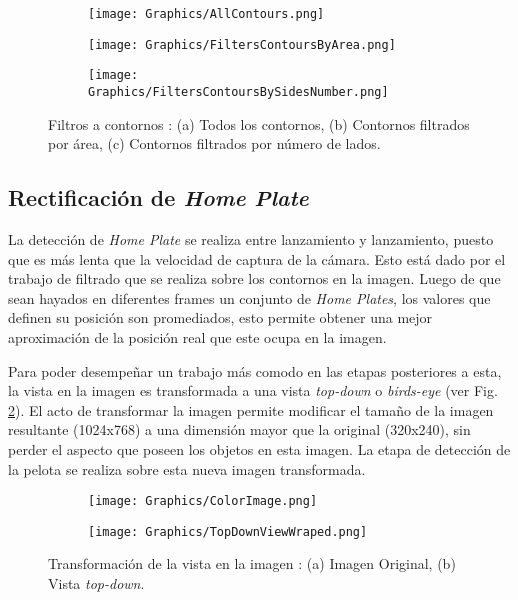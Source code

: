 \begin{figure}[h!]
	\centering
	\begin{subfigure}[b]{0.32\linewidth}
		\centering
		\texttt{[image: Graphics/AllContours.png]}
		\caption{}
	\end{subfigure}
	\begin{subfigure}[b]{0.32\linewidth}
		\centering
		\texttt{[image: Graphics/FiltersContoursByArea.png]}
		\caption{}
	\end{subfigure}
	\begin{subfigure}[b]{0.32\linewidth}
		\centering
		\texttt{[image: Graphics/FiltersContoursBySidesNumber.png]}
		\caption{}
	\end{subfigure}
	\caption{Filtros a contornos : (a) Todos los contornos, (b) Contornos filtrados por área, (c) Contornos filtrados por número de lados.}
	\label{fig:FilteredContours}
\end{figure}

\subsection{Rectificación de \textit{Home Plate}}

La detección de \textit{Home Plate} se realiza entre lanzamiento y lanzamiento, puesto que es más lenta que la velocidad de captura de la cámara. Esto está dado por el trabajo de filtrado que se realiza sobre los contornos en la imagen. Luego de que sean hayados en diferentes frames un conjunto de \textit{Home Plates}, los valores que definen su posición son promediados, esto permite obtener una mejor aproximación de la posición real que este ocupa en la imagen.

Para poder desempeñar un trabajo más comodo en las etapas posteriores a esta, la vista en la imagen es transformada a una vista \textit{top-down} o \textit{birds-eye} (ver Fig. \ref{fig:TopDownView}). El acto de transformar la imagen permite modificar el tamaño de la imagen resultante (1024x768) a una dimensión mayor que la original (320x240), sin perder el aspecto que poseen los objetos en esta imagen. La etapa de detección de la pelota se realiza sobre esta nueva imagen transformada.

\begin{figure}[!h]
	\centering
	\begin{subfigure}[b]{0.35\linewidth}
		\texttt{[image: Graphics/ColorImage.png]}
		\caption{}
	\end{subfigure}
	\begin{subfigure}[b]{0.35\linewidth}
		\texttt{[image: Graphics/TopDownViewWraped.png]}
		\caption{}
	\end{subfigure}
	\caption{Transformación de la vista en la imagen : (a) Imagen Original, (b) Vista \textit{top-down}.}
	\label{fig:TopDownView}
\end{figure}

